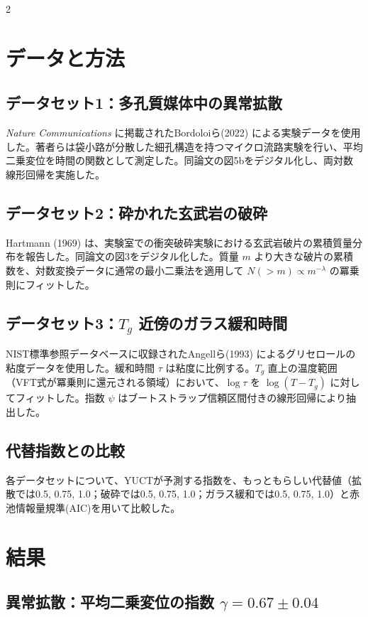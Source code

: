 \documentclass[11pt,a4paper]{article}
\begin{document}
\begin{multicols}{2}
		\section{データと方法}
		
		\subsection{データセット1：多孔質媒体中の異常拡散}
		\emph{Nature Communications} に掲載されたBordoloiら(2022) \cite{Bordoloi2022} による実験データを使用した。著者らは袋小路が分散した細孔構造を持つマイクロ流路実験を行い、平均二乗変位を時間の関数として測定した。同論文の図5bをデジタル化し、両対数線形回帰を実施した。
		
		\subsection{データセット2：砕かれた玄武岩の破砕}
		Hartmann (1969) \cite{Hartmann1969} は、実験室での衝突破砕実験における玄武岩破片の累積質量分布を報告した。同論文の図3をデジタル化した。質量 \(m\) より大きな破片の累積数を、対数変換データに通常の最小二乗法を適用して \(N(>m) \propto m^{-\lambda}\) の冪乗則にフィットした。
		
		\subsection{データセット3：\(T_g\) 近傍のガラス緩和時間}
		NIST標準参照データベースに収録されたAngellら(1993) \cite{Angell1993} によるグリセロールの粘度データを使用した。緩和時間 \(\tau\) は粘度に比例する。\(T_g\) 直上の温度範囲（VFT式が冪乗則に還元される領域）において、\(\log \tau\) を \(\log(T - T_g)\) に対してフィットした。指数 \(\psi\) はブートストラップ信頼区間付きの線形回帰により抽出した。
		
		\subsection{代替指数との比較}
		各データセットについて、YUCTが予測する指数を、もっともらしい代替値（拡散では0.5, 0.75, 1.0；破砕では0.5, 0.75, 1.0；ガラス緩和では0.5, 0.75, 1.0）と赤池情報量規準(AIC)を用いて比較した。
		
		\section{結果}
		
		\subsection{異常拡散：平均二乗変位の指数 \(\gamma = 0.67 \pm 0.04\)}
		

\end{multicols}
\end{document}
